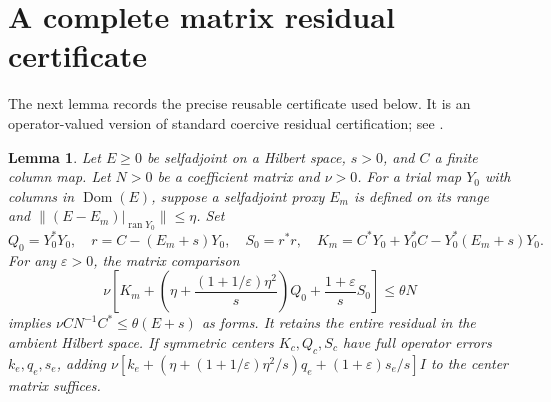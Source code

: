 \documentclass[12pt]{article}
\newtheorem{lemma}[theorem]{Lemma}
\theoremstyle{remark}\newtheorem{remark}[theorem]{Remark}
\newcommand{\Ran}{\operatorname{ran}}
\newcommand{\Dom}{\operatorname{Dom}}
\begin{document}
\section{A complete matrix residual certificate}
The next lemma records the precise reusable certificate used below.
It is an operator-valued version of standard coercive residual
certification; see \cite[Section 4.3, Proposition 4C]{PR}.
\begin{lemma}\label{matrixlemma}
Let $E\ge0$ be selfadjoint on a Hilbert space, $s>0$, and $C$ a
finite column map. Let $N>0$ be a coefficient matrix and $\nu>0$.
For a trial map $Y_0$ with columns in $\Dom(E)$, suppose a
selfadjoint proxy $E_m$ is defined on its range and
$\|(E-E_m)|_{\Ran Y_0}\|\le\eta$. Set
\[
 Q_0=Y_0^*Y_0,\quad r=C-(E_m+s)Y_0,\quad S_0=r^*r,
 \quad K_m=C^*Y_0+Y_0^*C-Y_0^*(E_m+s)Y_0.
\]
For any $\varepsilon>0$, the matrix comparison
\begin{equation}\label{matrixcriterion}
 \nu\left[K_m+
   \left(\eta+\frac{(1+1/\varepsilon)\eta^2}s\right)Q_0
    +\frac{1+\varepsilon}sS_0\right]\le\theta N
\end{equation}
implies $\nu CN^{-1}C^*\le\theta(E+s)$ as forms. It retains the
entire residual in the ambient Hilbert space.
If symmetric centers $K_c,Q_c,S_c$ have full operator errors
$k_e,q_e,s_e$, adding
$\nu[k_e+(\eta+(1+1/\varepsilon)\eta^2/s)q_e
 +(1+\varepsilon)s_e/s]I$ to the center matrix suffices.
\end{lemma}
\end{document}
